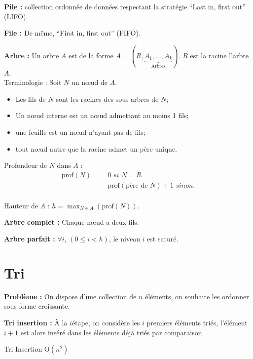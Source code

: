 \documentclass[a4paper, 8pt]{article}
\begin{document}
\begin{multicols*}{3}
\textbf{Pile :} collection ordonnée de données respectant la stratégie \enquote{Last in, first out} (LIFO).

\textbf{File :} De même, \enquote{First in, first out} (FIFO).

\textbf{Arbre :} Un arbre $A$ est de la forme $A = (R, \underbrace{A_1, \ldots, A_k}_{\text{Arbres}})$. $R$ est la racine l'arbre $A$.\\
Terminologie : Soit $N$ un nœud de $A$.
\begin{itemize}
\item Les fils de $N$ sont les racines des sous-arbres de $N$;
\item Un nœud interne est un nœud admettant au moins 1 fils;
\item une feuille est un nœud n'ayant pas de fils;
\item tout nœud autre que la racine admet un père unique.
\end{itemize}

Profondeur de $N$ dans $A$ :
\[
\begin{array}{rc|l}
\text{prof}(N) & = & 0 \textit{ si } N=R  \\
 & & \text{prof}(\text{père de }N) + 1 \textit{ sinon.}  \\
\end{array}
\]

Hauteur de $A$ : $h = \displaystyle \max_{N\in A}\left(\text{prof}(N)\right).$

\textbf{Arbre complet :} Chaque nœud a deux fils.

\textbf{Arbre parfait :} $\forall i$, $(0 \leqslant i < h)$, le niveau $i$ est saturé.

\section*{Tri}

\newcommand{\GO}{\text{O}}

\textbf{Problème :} On dispose d'une collection de $n$ éléments, on souhaite les ordonner sous forme croissante.

\textbf{Tri insertion :} \`{A} la $i$\ieme étape, on considère les $i$ premiers éléments triés, l'élément $i+1$ est alors inséré dans les éléments déjà triés par comparaison.
\begin{algorithm}[H]
 \caption{Tri Insertion $\GO(n^2)$}
\end{algorithm}


\end{multicols*}
\end{document}
